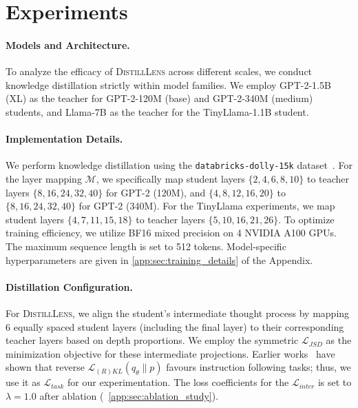 \documentclass{article}
\theoremstyle{plain}
\theoremstyle{definition}
\theoremstyle{remark}
\begin{document}
\section{Experiments}
\label{sec:experimental_setup}


\paragraph{Models and Architecture.}
To analyze the efficacy of \textsc{DistillLens} across different scales, we conduct knowledge distillation strictly within model families. We employ GPT-2-1.5B (XL) as the teacher for GPT-2-120M (base) and GPT-2-340M (medium) students, and Llama-7B as the teacher for the TinyLlama-1.1B student.

\paragraph{Implementation Details.}
We perform knowledge distillation using the \texttt{databricks-dolly-15k} dataset~\cite{gu2024minillm}. 
For the layer mapping $\mathcal{M}$, we specifically map student layers 
$\{2, 4, 6, 8, 10\}$ to teacher layers $\{8, 16, 24, 32, 40\}$ for GPT-2 (120M), 
and $\{4, 8, 12, 16, 20\}$ to $\{8, 16, 24, 32, 40\}$ for GPT-2 (340M). 
For the TinyLlama experiments, we map student layers $\{4, 7, 11, 15, 18\}$ to teacher layers $\{5, 10, 16, 21, 26\}$.
To optimize training efficiency, we utilize BF16 mixed precision on 4 NVIDIA A100 GPUs. 
The maximum sequence length is set to 512 tokens.
Model-specific hyperparameters are given in \cref{app:sec:training_details} of the Appendix.


\paragraph{Distillation Configuration.}
For \textsc{DistillLens}, we align the student's intermediate thought process by mapping $6$ equally spaced student layers (including the final layer) to their corresponding teacher layers based on depth proportions.
We employ the symmetric $\mathcal{L}_{JSD}$ as the minimization objective for these intermediate projections.
Earlier works~\cite{gu2024minillm,wu2024rethinking} have shown that reverse $\mathcal{L}_{(R)KL}(q_\theta \| p)$ favours instruction following tasks; thus, we use it as $\mathcal{L}_{task}$ for our experimentation.
The loss coefficients for the $\mathcal{L}_{inter}$ is set to $\lambda = 1.0$ after ablation (~\cref{app:sec:ablation_study}).
\end{document}

